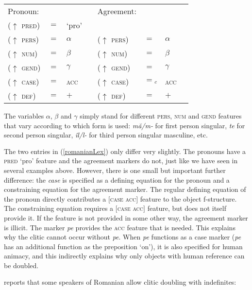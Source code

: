 \documentclass[output=paper,hidelinks]{langscibook}
\begin{document}
 
 
\ea\label{romanianLex}\begin{tabular}[t]{llllllll }
{Pronoun:} &&&&{Agreement:} &&& \\
($\uparrow$ \textsc{pred}) & $=$ & `pro'  &\\
 ($\uparrow$ \textsc{pers}) & $=$ & $\alpha$ & {\hspace{.2in} } &($\uparrow$ \textsc{pers}) & $=$ & $\alpha$  \\
 ($\uparrow$ \textsc{num}) & $=$ &  $\beta$  &&  ($\uparrow$ \textsc{num}) & $=$ &  $\beta$ \\
($\uparrow$ \textsc{gend}) & $=$ &   $\gamma$   &&($\uparrow$ \textsc{gend}) & $=$ &   $\gamma$  \\
 ($\uparrow$ \textsc{case}) & $=$ &  \textsc{acc}    && ($\uparrow$ \textsc{case}) & $=$$_c$ &  \textsc{acc}   \\
 ($\uparrow$ \textsc{def}) & $=$  &  $+$ && ($\uparrow$ \textsc{def}) & $=$  &  ${+}$  
 \end{tabular}
 \z
 The variables $\alpha$,  $\beta$ and $\gamma$ simply stand for different \textsc{pers, num} and \textsc{gend} features that vary according to which form is used:  \textit{m\u{a}/m-} for first person singular,  \textit{te} for second person singular,  \textit{îl/l-} for third person singular masculine, etc.
 
 The  two entries in (\ref{romanianLex})  only differ very slightly.  The pronouns have a \textsc{pred} `pro' feature and the agreement markers do not, just like  we have seen in several examples above.  However, there is one small but important further difference: the \textit{case} is specified as a defining equation for the pronoun and a constraining equation for the agreement marker.  The regular defining equation of the pronoun directly  contributes a  \textsc{$[$case acc$]$} feature to the object  f-structure.  The constraining equation requires a  \textsc{$[$case acc$]$}  feature,  but does not itself provide it.  If  the feature is not provided in some other way, the agreement marker is illicit.  The marker \textit{pe} provides   the \textsc{acc} feature that is needed. This explains why the clitic cannot  occur without  \textit{pe}.  When \textit{pe}  functions as a case marker (\textit{pe}  has an additional function as  the  preposition `on'), it  is also specified for human animacy, and this indirectly explains why only objects with human reference can be doubled.  
 
 \citet{tigau2010, tigau2014} reports that some speakers of Romanian allow clitic doubling with indefinites:
   
\end{document}
